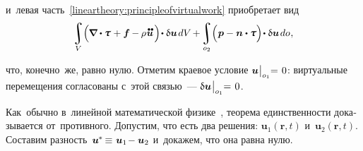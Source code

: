 \begin{otherlanguage}{russian}
\vspace{-0.2em} \noindent и~левая часть~\eqref{lineartheory:principleofvirtualwork} приобретает вид
\[
\integral\displaylimits_V \hspace{-0.5ex} \left(^{\mathstrut} \hspace{-0.2ex} \boldnabla \dotp \mathboldtau \hspace{0.12ex} + \bm{f} \hspace{-0.1ex} - \hspace{-0.1ex} \rho \hspace{0.1ex} \mathdotdotabove{\bm{u}} \hspace{0.25ex} \right) \hspace{-0.32ex} \dotp \variation{\bm{u}} \hspace{0.25ex} dV \hspace{-0.2ex} + \hspace{-0.2ex}
\integral\displaylimits_{o_2} \hspace{-0.5ex} \left(^{\mathstrut} \bm{p} - \bm{n} \dotp \mathboldtau \right) \hspace{-0.32ex} \dotp \variation{\bm{u}} \hspace{0.25ex} do \hspace{0.1ex},
\]

\vspace{-0.4em} \noindent что, конечно~же, равно нулю. Отметим краевое условие ${\bm{u} \hspace{0.1ex} \bigr|_{o_1} \hspace{-0.64ex} = \hspace{0.2ex} 0}$: виртуальные перемещения согласованы с~этой связью~--- ${\updelta\hspace{-0.1ex}\bm{u} \hspace{0.1ex} \bigr|_{o_1} \hspace{-0.64ex} = \hspace{0.2ex} 0}$.



\label{para:uniquenessfordynamicproblem}

Как~обычно в~линейной математической физике~\cite{lurie-theoryofelasticity, tihonovsamarsky-mathphysicsequations}, теорема единственности доказывается от~противного. Допустим, что есть два решения: ${\bm{u}_1 (\bm{r}, t)}$ и~${\bm{u}_2 (\bm{r}, t)}$. Составим разность~${\bm{u}^{\hspace{-0.1ex}*} \hspace{-0.2ex} \equiv \hspace{0.12ex} \bm{u}_1 \hspace{-0.32ex} - \bm{u}_2}$ и~докажем, что она равна нулю.


\end{otherlanguage}
